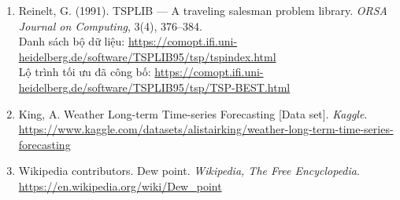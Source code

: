 \begin{enumerate}
\item Reinelt, G. (1991). TSPLIB — A traveling salesman problem library. \textit{ORSA Journal on Computing}, 3(4), 376--384. \\
Danh sách bộ dữ liệu: \url{https://comopt.ifi.uni-heidelberg.de/software/TSPLIB95/tsp/tspindex.html} \\
Lộ trình tối ưu đã công bố: \url{https://comopt.ifi.uni-heidelberg.de/software/TSPLIB95/tsp/TSP-BEST.html}

\item King, A. Weather Long-term Time-series Forecasting [Data set]. \textit{Kaggle}. \url{https://www.kaggle.com/datasets/alistairking/weather-long-term-time-series-forecasting}

\item Wikipedia contributors. Dew point. \textit{Wikipedia, The Free Encyclopedia}. \url{https://en.wikipedia.org/wiki/Dew_point}

\end{enumerate}
